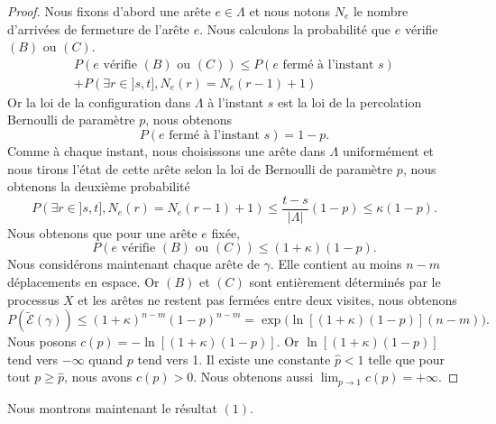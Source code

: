 \documentclass[titlepage,a4paper,12pt]{article}
\begin{document}
\begin{proof}
Nous fixons d'abord une arête $e\in \Lambda$ et nous notons $N_e$ le nombre d'arrivées de fermeture de l'arête $e$. Nous calculons la probabilité que $e$ vérifie $(B)$ ou $(C)$.
\begin{multline*}P(e \text{ vérifie }(B) \text{ ou }(C))\leqslant P(e \text{ fermé à l'instant } s)\\+P(\exists r \in ]s,t], N_e(r)=N_e(r-1)+1)
\end{multline*}
Or la loi de la configuration dans $\Lambda$ à l'instant $s$ est la loi de la percolation Bernoulli de paramètre $p$, nous obtenons $$P(e \text{ fermé à l'instant } s) = 1-p.$$
Comme à chaque instant, nous choisissons une arête dans $\Lambda$ uniformément et nous tirons l'état de cette arête selon la loi de Bernoulli de paramètre $p$, nous obtenons la deuxième probabilité
$$ P(\exists r \in ]s,t], N_e(r)=N_e(r-1)+1) \leqslant \frac{t-s}{|\Lambda|}(1-p)\leqslant \kappa(1-p).
$$
Nous obtenons que pour une arête $e$ fixée, $$P(e \text{ vérifie }(B) \text{ ou }(C))\leqslant (1+\kappa)(1-p).$$
Nous considérons maintenant chaque arête de $\gamma$. Elle contient au moins $n-m$ déplacements en espace. Or $(B)$ et $(C)$ sont entièrement déterminés par le processus $X$ et les arêtes ne restent pas fermées entre deux visites, nous obtenons 
$$P(\tilde{\mathcal{E}}(\gamma))\leqslant (1+\kappa)^{n-m}(1-p)^{n-m} = \exp\big(\ln[(1+\kappa)(1-p)](n-m)\big).
$$ 
Nous posons $c(p) = -\ln[(1+\kappa)(1-p)]$. Or $\ln[(1+\kappa)(1-p)]$ tend vers $-\infty$ quand $p$ tend vers 1. Il existe une constante $\hat{p}<1$ telle que pour tout $p\geqslant \hat{p}$, nous avons $c(p)>0$. Nous obtenons aussi 
$ \lim_{p\rightarrow 1}c(p) = +\infty
$.
\end{proof}
Nous montrons maintenant le résultat $(1)$. 
\end{document}

